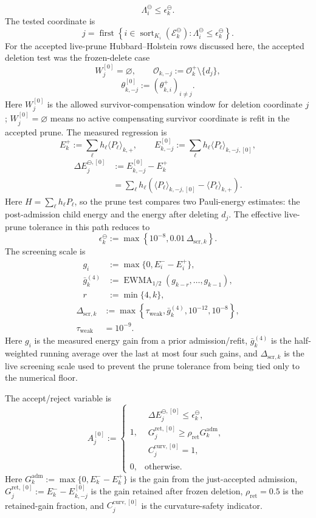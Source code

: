 \documentclass[
  reprint,
  amsmath,
  amssymb,
  aps,
  pra,
  nofootinbib,
  superscriptaddress,
  floatfix
]{revtex4-2}
\begin{document}
\[
\Lambda_i^{\ominus}\le \epsilon_k^{\ominus}.
\]
The tested coordinate is
\[
j
=
\operatorname{first}
\left\{
i\in \operatorname{sort}_{K_i}(\mathcal E_k^{\ominus})
:
\Lambda_i^{\ominus}\le \epsilon_k^{\ominus}
\right\}.
\]
For the accepted live-prune Hubbard--Holstein rows discussed here, the accepted deletion test was the frozen-delete case
\[
W_j^{[0]}=\varnothing,
\qquad
\mathcal O_{k,-j}:=\mathcal O_k^+\setminus\{d_j\},
\]
\[
\theta_{k,-j}^{[0]}:=(\theta_{k,i}^+)_{i\ne j}.
\]
Here \(W_j^{[0]}\) is the allowed survivor-compensation window for deletion coordinate \(j\); \(W_j^{[0]}=\varnothing\) means no active compensating survivor coordinate is refit in the accepted prune.  The measured regression is
\[
E_k^+
:=
\sum_{\ell}h_\ell\langle P_\ell\rangle_{k,+},
\qquad
E_{k,-j}^{[0]}
:=
\sum_{\ell}h_\ell\langle P_\ell\rangle_{k,-j,[0]},
\]
\[
\begin{aligned}
\Delta E_j^{\ominus,[0]}
&:=
E_{k,-j}^{[0]}-E_k^+
\\
&=
\sum_{\ell}h_\ell
\left(
\langle P_\ell\rangle_{k,-j,[0]}
-
\langle P_\ell\rangle_{k,+}
\right).
\end{aligned}
\]
Here \(H=\sum_\ell h_\ell P_\ell\), so the prune test compares two Pauli-energy estimates: the post-admission child energy and the energy after deleting \(d_j\).  The effective live-prune tolerance in this path reduces to
\[
\epsilon_k^{\ominus}
:=
\max\left\{
10^{-8},
0.01\,\Delta_{\mathrm{scr},k}
\right\}.
\]
The screening scale is
\[
\begin{aligned}
g_i
&:=
\max\{0,E_i^- - E_i^+\},
\\
\bar g_k^{(4)}
&:=
\operatorname{EWMA}_{1/2}
(g_{k-r},\ldots,g_{k-1}),
\\
r&:=\min\{4,k\},
\end{aligned}
\]
\[
\begin{aligned}
\Delta_{\mathrm{scr},k}
&:=
\max\left\{
\tau_{\mathrm{weak}},
\bar g_k^{(4)},
10^{-12},
10^{-8}
\right\},
\\
\tau_{\mathrm{weak}}&=10^{-9}.
\end{aligned}
\]
Here \(g_i\) is the measured energy gain from a prior admission/refit, \(\bar g_k^{(4)}\) is the half-weighted running average over the last at most four such gains, and \(\Delta_{\mathrm{scr},k}\) is the live screening scale used to prevent the prune tolerance from being tied only to the numerical floor.

The accept/reject variable is
\[
A_j^{[0]}
:=
\begin{cases}
1,
&
\begin{array}{l}
\Delta E_j^{\ominus,[0]}\le \epsilon_k^{\ominus},
\\
G_j^{\mathrm{ret},[0]}\ge \rho_{\mathrm{ret}}G_k^{\mathrm{adm}},
\\
C_j^{\mathrm{curv},[0]}=1,
\end{array}
\\[2ex]
0,
&
\text{otherwise}.
\end{cases}
\]
Here \(G_k^{\mathrm{adm}}:=\max\{0,E_k^- - E_k^+\}\) is the gain from the just-accepted admission, \(G_j^{\mathrm{ret},[0]}:=E_k^- - E_{k,-j}^{[0]}\) is the gain retained after frozen deletion, \(\rho_{\mathrm{ret}}=0.5\) is the retained-gain fraction, and \(C_j^{\mathrm{curv},[0]}\) is the curvature-safety indicator.
\end{document}
